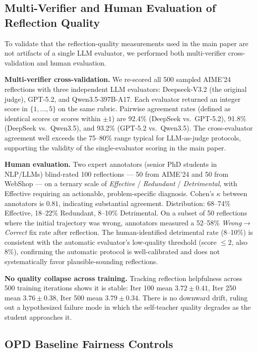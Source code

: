 \documentclass{article}
\theoremstyle{plain}
\theoremstyle{definition}
\theoremstyle{remark}
\begin{document}
\subsection{Multi-Verifier and Human Evaluation of Reflection Quality}
\label{appendix:human_eval}

To validate that the reflection-quality measurements used in the main paper are not artifacts of a single LLM evaluator, we performed both multi-verifier cross-validation and human evaluation.

\textbf{Multi-verifier cross-validation.}
We re-scored all 500 sampled AIME'24 reflections with three independent LLM evaluators: Deepseek-V3.2 (the original judge), GPT-5.2, and Qwen3.5-397B-A17.
Each evaluator returned an integer score in $\{1,\dots,5\}$ on the same rubric.
Pairwise agreement rates (defined as identical scores or scores within $\pm 1$) are 92.4\% (DeepSeek vs.\ GPT-5.2), 91.8\% (DeepSeek vs.\ Qwen3.5), and 93.2\% (GPT-5.2 vs.\ Qwen3.5).
The cross-evaluator agreement well exceeds the 75--80\% range typical for LLM-as-judge protocols, supporting the validity of the single-evaluator scoring in the main paper.

\textbf{Human evaluation.}
Two expert annotators (senior PhD students in NLP/LLMs) blind-rated 100 reflections --- 50 from AIME'24 and 50 from WebShop --- on a ternary scale of \textit{Effective} / \textit{Redundant} / \textit{Detrimental}, with Effective requiring an actionable, problem-specific diagnosis.
Cohen's $\kappa$ between annotators is $0.81$, indicating substantial agreement.
Distribution: 68--74\% Effective, 18--22\% Redundant, 8--10\% Detrimental.
On a subset of 50 reflections where the initial trajectory was wrong, annotators measured a 52--58\% \textit{Wrong}$\to$\textit{Correct} fix rate after reflection.
The human-identified detrimental rate (8--10\%) is consistent with the automatic evaluator's low-quality threshold (score $\leq 2$, also 8\%), confirming the automatic protocol is well-calibrated and does not systematically favor plausible-sounding reflections.

\textbf{No quality collapse across training.}
Tracking reflection helpfulness across 500 training iterations shows it is stable: Iter 100 mean $3.72\pm0.41$, Iter 250 mean $3.76\pm0.38$, Iter 500 mean $3.79\pm0.34$.
There is no downward drift, ruling out a hypothesized failure mode in which the self-teacher quality degrades as the student approaches it.

\subsection{OPD Baseline Fairness Controls}
\label{appendix:opd_fairness}
\end{document}
